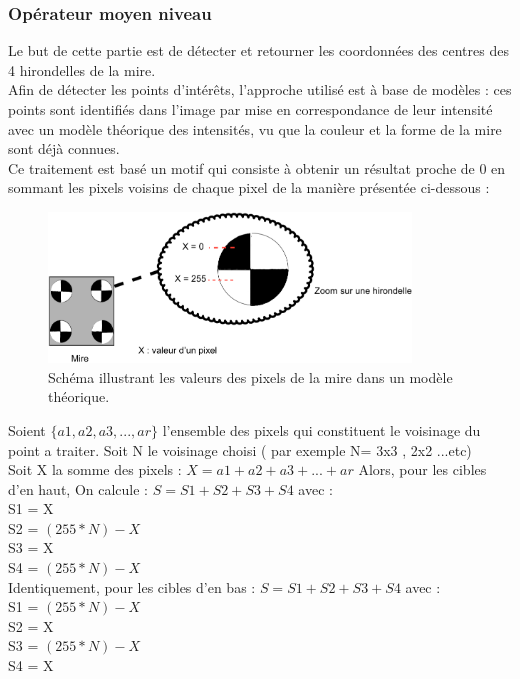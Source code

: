 \documentclass[12pt]{article}
\begin{document}
\subsubsection{Opérateur moyen niveau }
Le but de cette partie est de détecter et retourner les coordonnées des centres des 4 hirondelles de la mire.\\
Afin de détecter les points d'intérêts, l'approche utilisé est à base de modèles : ces points sont identifiés dans l’image par mise en correspondance de leur intensité avec un modèle théorique des intensités, vu que la couleur et la forme de la mire sont déjà connues.\\
Ce traitement est basé un motif qui consiste à obtenir un résultat proche de 0 en sommant les pixels voisins de chaque pixel de la manière présentée ci-dessous :\\

 \begin{figure}[H]
\centering
\includegraphics[height=4cm]{B_Shema1.jpg}
\caption{Schéma illustrant les valeurs des pixels de la mire dans un modèle théorique. }
\label{fig:calcul}
\end{figure}


Soient $\{a1 , a2 , a3,...,ar\}$ l'ensemble des pixels qui constituent le voisinage du point a traiter. Soit N le voisinage choisi ( par exemple N= 3x3 , 2x2 ...etc)\\


Soit X la somme des pixels : $X = a1 + a2+ a3 +...+ar $
Alors, pour les cibles d'en haut, On calcule : $S = S1 + S2 +S3 + S4$ avec :\\
 S1 = X \\
S2 = $(255*N) - X $ \\
S3 = X \\
S4 = $(255*N) - X $ \\

Identiquement, pour les cibles d'en bas : 
$S = S1 + S2 +S3 + S4$ avec : \\
S1 = $(255*N) - X $ \\
S2 = X \\
S3 = $(255*N) - X $ \\
S4 = X \\
 
\end{document}
